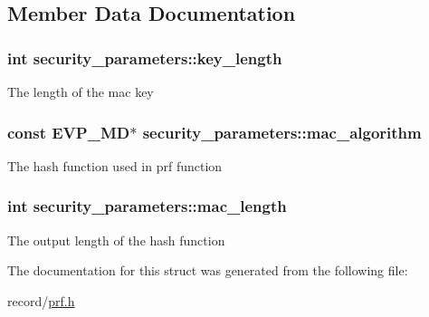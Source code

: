 \subsection{Member Data Documentation}
\hypertarget{structsecurity__parameters_a29b3227de735a7c1e0d0083a75746015}{
\subsubsection[{key\-\_\-length}]{\setlength{\rightskip}{0pt plus 5cm}int security\-\_\-parameters\-::key\-\_\-length}}\label{structsecurity__parameters_a29b3227de735a7c1e0d0083a75746015}
The length of the mac key \hypertarget{structsecurity__parameters_a86561290bd325ef969a3450ab8868966}{
\subsubsection[{mac\-\_\-algorithm}]{\setlength{\rightskip}{0pt plus 5cm}const E\-V\-P\-\_\-\-M\-D$\ast$ security\-\_\-parameters\-::mac\-\_\-algorithm}}\label{structsecurity__parameters_a86561290bd325ef969a3450ab8868966}
The hash function used in prf function \hypertarget{structsecurity__parameters_ae14edd76dec6b2c7b9a427b892e275d0}{
\subsubsection[{mac\-\_\-length}]{\setlength{\rightskip}{0pt plus 5cm}int security\-\_\-parameters\-::mac\-\_\-length}}\label{structsecurity__parameters_ae14edd76dec6b2c7b9a427b892e275d0}
The output length of the hash function 

The documentation for this struct was generated from the following file\-:\begin{DoxyCompactItemize}
\item 
record/\hyperlink{prf_8h}{prf.\-h}\end{DoxyCompactItemize}
